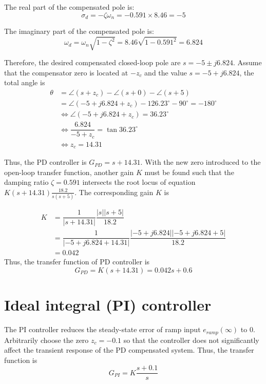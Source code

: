 The real part of the compensated pole is:
\begin{equation}
	\sigma_d = -\zeta\omega_n = -0.591\times 8.46 = -5
\end{equation}

The imaginary part of the compensated pole is:
\begin{equation}
	\omega_d = \omega_n\sqrt{1-\zeta^2} = 8.46\sqrt{1-0.591^2} = 6.824
\end{equation}

Therefore, the desired compensated closed-loop pole are $ s = -5\pm j6.824 $. Assume that the compensator zero is located at $ -z_c $ and the value $ s = -5 + j6.824 $, the total angle is
\[
\begin{array}{ll}
\theta & = \angle (s+z_c) - \angle (s+0) - \angle (s+5)\\
&  = \angle (-5 + j6.824 + z_c) - 126.23^\circ - 90^\circ = -180^\circ\\
&\Leftrightarrow \angle (-5 + j6.824 + z_c) = 36.23^\circ\\
&\Leftrightarrow \dfrac{6.824}{-5 + z_c} = \tan 36.23^\circ\\
&\Leftrightarrow z_c = 14.31
\end{array}
\]

Thus, the PD controller is $ G_{PD} = s+14.31 $. With the new zero introduced to the open-loop transfer function, another gain $ K $ must be found such that the damping ratio $ \zeta = 0.591 $ intersects the root locus of equation $ K(s+14.31)\frac{18.2}{s(s+5)} $. The corresponding gain $ K $ is

\begin{equation}
	\begin{array}{ll}
	K &= \dfrac{1}{|s+14.31|}\dfrac{|s||s+5|}{18.2}\\
	&= \dfrac{1}{|-5 + j6.824+14.31|}\dfrac{|-5 + j6.824||-5 + j6.824+5|}{18.2}\\
	&= 0.042
	\end{array}
\end{equation}
Thus, the transfer function of PD controller is
\begin{equation}
	G_{PD} = K(s+14.31) = 0.042s + 0.6
\end{equation}

\section{Ideal integral (PI) controller}
The PI controller reduces the steady-state error of ramp input $ e_{ramp}(\infty) $ to 0. Arbitrarily choose the zero $ z_c = -0.1 $ so that the controller does not significantly affect the transient response of the PD compensated system. Thus, the transfer function is
\begin{equation}
	G_{PI} = K\dfrac{s+0.1}{s}
\end{equation}

